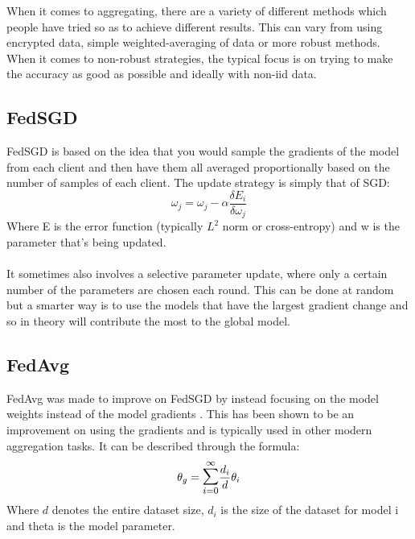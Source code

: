 When it comes to aggregating, there are a variety of different methods which people have tried so as to achieve different results.
This can vary from using encrypted data, simple weighted-averaging of data or more robust methods.
When it comes to non-robust strategies, the typical focus is on trying to make the accuracy as good as possible and ideally with non-iid data.


\subsection{FedSGD}
FedSGD is based on the idea that you would sample the gradients of the model from each client and then have them all averaged proportionally based on the number of samples of each client.
The update strategy is simply that of SGD:
\begin{equation}
    \omega_j = \omega_j - \alpha \dfrac{\delta E_i}{\delta \omega_j}
\end{equation}
Where E is the error function (typically $L^2$ norm or cross-entropy) and w is the parameter that's being updated.
\\ \\
It sometimes also involves a selective parameter update, where only a certain number of the parameters are chosen each round.
This can be done at random but a smarter way is to use the models that have the largest gradient change and so in theory will contribute the most to the global model.


\subsection{FedAvg}
FedAvg was made to improve on FedSGD by instead focusing on the model weights instead of the model gradients \cite[section 2.1]{robagg_health}.
This has been shown to be an improvement on using the gradients and is typically used in other modern aggregation tasks.
It can be described through the formula:
\begin{equation}
    \theta_g = \mathlarger{\mathlarger{\sum}}_{i=0}^{\infty} \dfrac{d_i}{d} \theta_i
\end{equation}
Where $d$ denotes the entire dataset size, $d_i$ is the size of the dataset for model i and theta is the model parameter.


